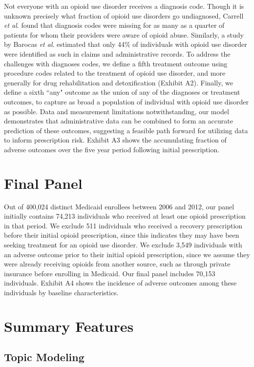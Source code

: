 \documentclass[11pt, letter]{article}
\begin{document}
Not everyone with an opioid use disorder receives a diagnosis code. Though it is unknown precisely what fraction of opioid use disorders go undiagnosed, Carrell {\em et al}. found that diagnosis codes were missing for as many as a quarter of patients for whom their providers were aware of opioid abuse. Similarly, a study by Barocas {\em et al}. estimated that only 44\% of individuals with opioid use disorder were identified as such in claims and administrative records. To address the challenges with diagnoses codes, we define a fifth treatment outcome using procedure codes related to the treatment of opioid use disorder, and more generally for drug rehabilitation and detoxification (Exhibit A2). Finally, we define a sixth ``any" outcome as the union of any of the diagnoses or treatment outcomes, to capture as broad a population of individual with opioid use disorder as possible. Data and measurement limitations notwithstanding, our model demonstrates that administrative data can be combined to form an accurate prediction of these outcomes, suggesting a feasible path forward for utilizing data to inform prescription risk. Exhibit A3 shows the accumulating fraction of adverse outcomes over the five year period following initial prescription.

\section{Final Panel}

Out of 400,024 distinct Medicaid enrollees between 2006 and 2012, our panel initially contains 74,213 individuals who received at least one opioid prescription in that period. We exclude 511 individuals who received a recovery prescription before their initial opioid prescription, since this indicates they may have been seeking treatment for an opioid use disorder. We exclude 3,549 individuals with an adverse outcome prior to their initial opioid prescription, since we assume they were already receiving opioids from another source, such as through private insurance before enrolling in Medicaid. Our final panel includes 70,153 individuals. Exhibit A4 shows the incidence of adverse outcomes among these individuals by baseline characteristics.

\section{Summary Features}


\subsection{Topic Modeling}
\end{document}
